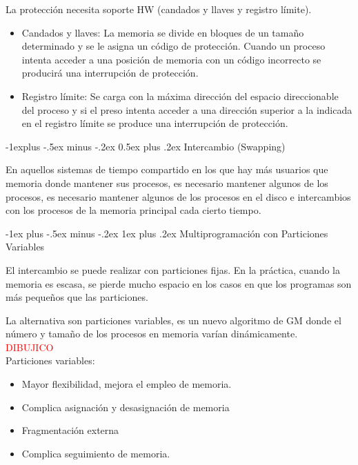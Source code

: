 \documentclass[10pt,portrait, twocolumn]{article}
\makeatletter
\renewcommand{\subsection}{\@startsection{subsection}{2}{0mm}%
                                {-1explus -.5ex minus -.2ex}%
                                {0.5ex plus .2ex}%
                                {\normalfont\normalsize\bfseries}}
\renewcommand{\subsubsection}{\@startsection{subsubsection}{3}{0mm}%
                                {-1ex plus -.5ex minus -.2ex}%
                                {1ex plus .2ex}%
                                {\normalfont\small\bfseries}}
\makeatother
\begin{document}
La protección necesita soporte HW (candados y llaves y registro límite).

	\begin{itemize}
	\item Candados y llaves: La memoria se divide en bloques de un tamaño determinado y se le asigna un código de protección. Cuando un proceso intenta acceder a una posición de memoria con un código incorrecto se producirá una interrupción de protección.
	\item Registro límite: Se carga con la máxima dirección del espacio direccionable del proceso y si el preso intenta acceder a una dirección superior a la indicada en el registro límite se produce una interrupción de protección.
	\end{itemize}
	
\subsection{Intercambio (Swapping)}

En aquellos sistemas de tiempo compartido en los que hay más usuarios que memoria donde mantener sus procesos, es necesario mantener algunos de los procesos, es necesario mantener algunos de los procesos en el disco e intercambios con los procesos de la memoria principal cada cierto tiempo.

\subsubsection{Multiprogramación con Particiones Variables}

El intercambio se puede realizar con particiones fijas. En la práctica, cuando la memoria es escasa, se pierde mucho espacio en los casos en que los programas son más pequeños que las particiones.

\quad La alternativa son particiones variables, es un nuevo algoritmo de GM donde el número y tamaño de los procesos en memoria varían dinámicamente.\\

\textcolor{red}{DIBUJICO}\\

Particiones variables:

	\begin{itemize}
	\item Mayor flexibilidad, mejora el empleo de memoria.
	\item Complica asignación y desasignación de memoria
	\item Fragmentación externa
	\item Complica seguimiento de memoria.
	\end{itemize}
	
\end{document}
